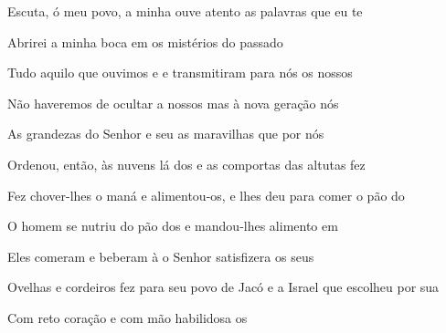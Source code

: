 \begin{greenumerate}
  \item {}Escuta, ó meu povo, a minha  ouve atento as palavras que eu te 

  \item {}Abrirei a minha boca em  os mistérios do passado 

  \item {}Tudo aquilo que ouvimos e  e transmitiram para nós os nossos 

  \item {}Não haveremos de ocultar a nossos  mas à nova geração nós 

  \item {}As grandezas do Senhor e seu  as maravilhas que por nós 

  \item {}Ordenou, então, às nuvens lá dos  e as comportas das altutas fez 

  \item {}Fez chover-lhes o maná e alimentou-os, e lhes deu para comer o pão do 

  \item {}O homem se nutriu do pão dos  e mandou-lhes alimento em 

  \item {}Eles comeram e beberam à 
  o Senhor satisfizera os seus 

  \item {}Ovelhas e cordeiros fez  para seu povo de Jacó  e a Israel que escolheu por sua 

  \item {}Com reto coração  e com mão habilidosa os 
\end{greenumerate}